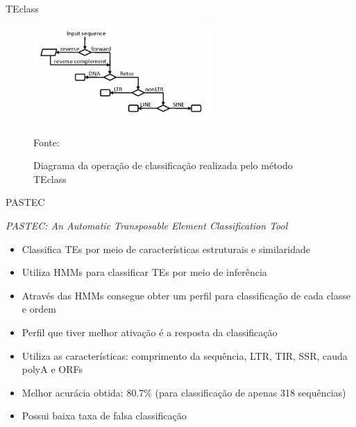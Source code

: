 \documentclass[%
  xcolor=table,%
  10pt,%
  aspectratio = 169,%
  compress,%
  t,%
]{beamer}%
\begin{document}
\begin{frame}{}{TEclass}
    \begin{figure}
        \centering
        \includegraphics[width=0.6\textwidth]{./Figuras/workflow-teclass.png}
        \caption{Diagrama da operação de classificação realizada pelo método TEclass}
        \scriptsize Fonte: \cite{teclass}
    \end{figure}
\end{frame}

\begin{frame}{}{PASTEC}
    \begin{block}{\textit{PASTEC: An Automatic Transposable Element Classification Tool}}
        \begin{itemize}
            \item Classifica TEs por meio de características estruturais e similaridade
            \item Utiliza HMMs para classificar TEs por meio de inferência
            \item Através das HMMs consegue obter um perfil para classificação de cada classe e ordem
            \item Perfil que tiver melhor ativação é a resposta da classificação
            \item Utiliza as características: comprimento da sequência, LTR, TIR, SSR, cauda polyA e ORFs
            \item Melhor acurácia obtida: 80.7\% (para classificação de apenas 318 sequências)
            \item Possui baixa taxa de falsa classificação
        \end{itemize}
    \end{block}
\end{frame}
\end{document}

